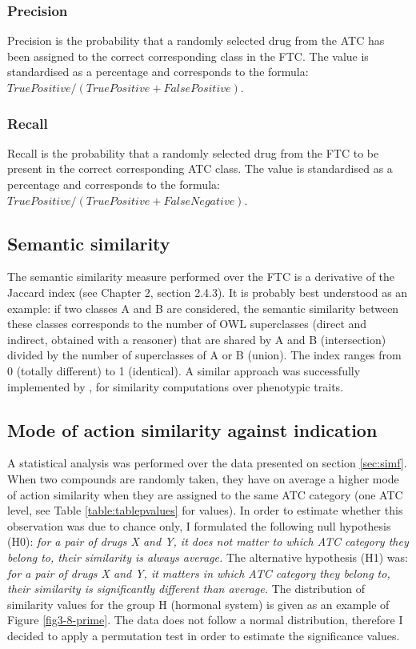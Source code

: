 \subsubsection{Precision}
Precision is the probability that a randomly selected drug from the ATC has been assigned to the correct corresponding class in the FTC. The value is standardised as a percentage and corresponds to the formula: $ True Positive / (True Positive + False Positive) $.

\subsubsection{Recall}
Recall is the probability that a randomly selected drug from the FTC to be present in the correct corresponding ATC class. The value is standardised as a percentage and corresponds to the formula: $ True Positive / (True Positive + False Negative) $.

\subsection{Semantic similarity}
\label{sec:semanticsim}
The semantic similarity measure performed over the FTC is a derivative of the Jaccard index \citep{jaccard1912distribution} \citep{rogers1960computer} (see Chapter 2, section 2.4.3). It is probably best understood as an example: if two classes A and B are considered, the semantic similarity between these classes corresponds to the number of OWL superclasses (direct and indirect, obtained with a reasoner) that are shared by A and B (intersection) divided by the number of superclasses of A or B (union). The index ranges from 0 (totally different) to 1 (identical). A similar approach was successfully implemented by \cite{hoehndorf2011phenomenet}, for similarity computations over phenotypic traits.

\subsection{Mode of action similarity against indication}
\label{moa-pvalues}
A statistical analysis was performed over the data presented on section \ref{sec:simf}. When two compounds are randomly taken, they have on average a higher mode of action similarity when they are assigned to the same ATC category (one ATC level, see Table \ref{table:tablepvalues} for values). In order to estimate whether this observation was due to chance only, I formulated the following null hypothesis (H0): \emph{for a pair of drugs X and Y, it does not matter to which ATC category they belong to, their similarity is always average.} The alternative hypothesis (H1) was: \emph{for a pair of drugs X and Y, it matters in which ATC category they belong to, their similarity is significantly different than average.}
The distribution of similarity values for the group H (hormonal system) is given as an example of Figure \ref{fig3-8-prime}. The data does not follow a normal distribution, therefore I decided to apply a permutation test in order to estimate the significance values.

